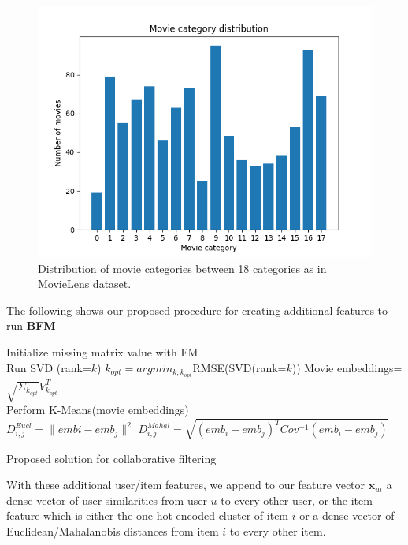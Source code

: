 \documentclass[10pt,conference,compsocconf]{IEEEtran}
\begin{document}
    \begin{figure}
        \includegraphics[width=\columnwidth]{figures/movie_category_distribution.png}
        \caption{Distribution of movie categories between 18 categories as in MovieLens dataset.}
        \label{fig:movie_category_distribution}
    \end{figure}

    The following  shows our proposed procedure for creating additional features to run \textbf{BFM}

    \begin{algorithm}
        Initialize missing matrix value with FM\\
         {
        Run SVD (rank=$k$)
        $k_{opt}=argmin_{k, k_{opt}}$RMSE(SVD(rank=$k$))
        }
            Movie embeddings= $\sqrt{\Sigma_{k_{opt}}}V_{k_{opt}}^T$\\
            Perform K-Means(movie embeddings)\\
             {
             {
            $D_{i,j} ^{Eucl} = \|embi - emb_j\|^2$
            }
                }
                 {
                 {
                $D_{i,j} ^{Mahal} = \sqrt{(emb_i-emb_j)^TCov^{-1}(emb_i-emb_j)}$
                }
                    }
                    \caption{Proposed solution for collaborative filtering}
                    \label{alg:algo1}
    \end{algorithm}

    With these additional user/item features, we append to our feature vector $\mathbf{x}_{ui}$ a dense vector of user similarities from user $u$ to every other user, or the item feature which is either the one-hot-encoded cluster of item $i$ or a dense vector of Euclidean/Mahalanobis distances from item $i$ to every other item.
\end{document}
